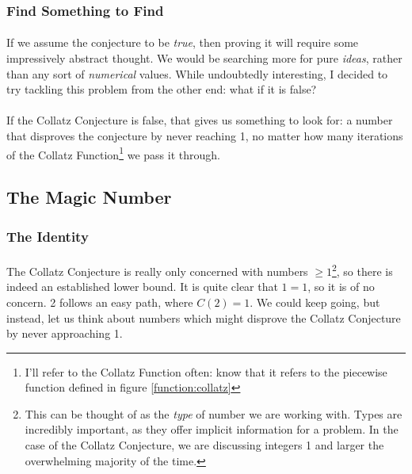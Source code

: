 \documentclass[12pt,letterpaper]{article}
\begin{document}
			\subsubsection{Find Something to Find}
			
				\paragraph{} If we assume the conjecture to be \textit{true}, then proving it will require some impressively abstract thought. We would be searching more for pure \textit{ideas}, rather than any sort of \textit{numerical} values. While undoubtedly interesting, I decided to try tackling this problem from the other end: what if it is false?
				
				\paragraph{} If the Collatz Conjecture is false, that gives us something to look for: a number that disproves the conjecture by never reaching 1, no matter how many iterations of the Collatz Function\footnote{I'll refer to the Collatz Function often: know that it refers to the piecewise function defined in figure \ref{function:collatz}} we pass it through.
				
		\subsection{The Magic Number}
		
			\subsubsection{The Identity}
				
				\paragraph{} The Collatz Conjecture is really only concerned with numbers $\geqslant 1$\footnote{This can be thought of as the \emph{type} of number we are working with. Types are incredibly important, as they offer implicit information for a problem. In the case of the Collatz Conjecture, we are discussing integers 1 and larger the overwhelming majority of the time.}, so there is indeed an established lower bound. It is quite clear that $1 = 1$, so it is of no concern. 2 follows an easy path, where $C(2) = 1$. We could keep going, but instead, let us think about numbers which might disprove the Collatz Conjecture by never approaching 1.
				
\end{document}
